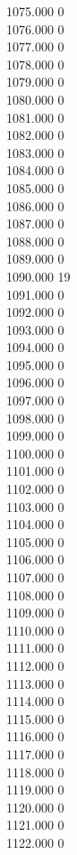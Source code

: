 { 1075.000	0 \\
 1076.000	0 \\
 1077.000	0 \\
 1078.000	0 \\
 1079.000	0 \\
 1080.000	0 \\
 1081.000	0 \\
 1082.000	0 \\
 1083.000	0 \\
 1084.000	0 \\
 1085.000	0 \\
 1086.000	0 \\
 1087.000	0 \\
 1088.000	0 \\
 1089.000	0 \\
 1090.000	19 \\
 1091.000	0 \\
 1092.000	0 \\
 1093.000	0 \\
 1094.000	0 \\
 1095.000	0 \\
 1096.000	0 \\
 1097.000	0 \\
 1098.000	0 \\
 1099.000	0 \\
 1100.000	0 \\
 1101.000	0 \\
 1102.000	0 \\
 1103.000	0 \\
 1104.000	0 \\
 1105.000	0 \\
 1106.000	0 \\
 1107.000	0 \\
 1108.000	0 \\
 1109.000	0 \\
 1110.000	0 \\
 1111.000	0 \\
 1112.000	0 \\
 1113.000	0 \\
 1114.000	0 \\
 1115.000	0 \\
 1116.000	0 \\
 1117.000	0 \\
 1118.000	0 \\
 1119.000	0 \\
 1120.000	0 \\
 1121.000	0 \\
 1122.000	0 \\
}

